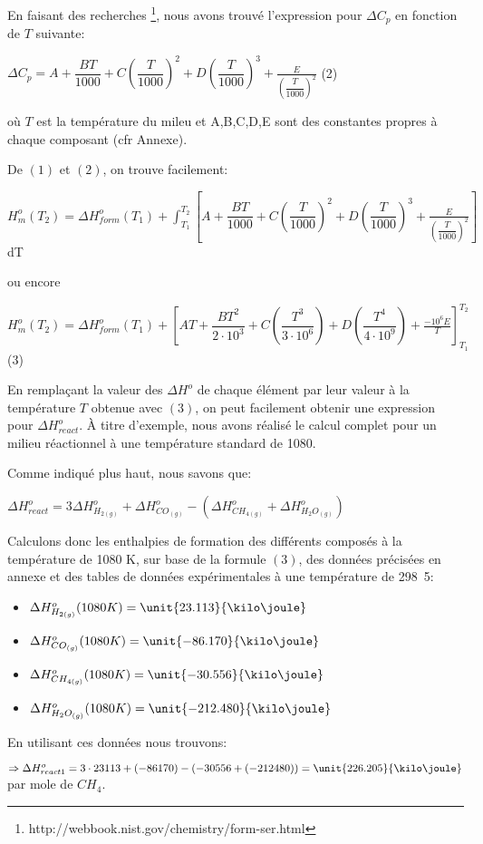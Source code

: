 \documentclass[11pt,a4paper]{report}
\begin{document}
En faisant des recherches \footnote{http://webbook.nist.gov/chemistry/form-ser.html}, nous avons trouvé l'expression pour $\Delta C_p$ en fonction de $T$ suivante:

$\Delta C_p=A+\dfrac{BT}{1000}+C(\dfrac{T}{1000})^2+D(\dfrac{T}{1000})^3+\frac{E}{(\dfrac{T}{1000})^2}$        (2)

où $T$ est la température du mileu et A,B,C,D,E sont des constantes propres à chaque composant (cfr Annexe).

De $(1)$ et $(2)$, on trouve facilement:

$H^o_m(T_2)=\Delta H^o_{form}(T_1)+\int_{T_1}^{T_2} [A+\dfrac{BT}{1000}+C(\dfrac{T}{1000})^2+D(\dfrac{T}{1000})^3+\frac{E}{(\dfrac{T}{1000})^2}]$dT

ou encore

$H^o_m(T_2)=\Delta H^o_{form}(T_1) + [AT+\dfrac{BT^2}{2\cdot10^3}+C(\dfrac{T^3}{3\cdot10^6})+D(\dfrac{T^4}{4\cdot10^9})+\frac{-10^6E}{T}]^{T_2}_{T_1}$(3) 

En remplaçant la valeur des $\Delta H^o$ de chaque élément par leur valeur à la température $T$ obtenue avec $(3)$, on
peut facilement obtenir une expression pour $\Delta H^o_{react}$. À titre d'exemple, nous avons réalisé le calcul complet
pour un milieu réactionnel à une température standard de \unit{1080}{\kelvin}.

Comme indiqué plus haut, nous savons que:

$\Delta H^o_{react}=3\Delta H^o_{H_{2(g)}} + \Delta H^o_{CO_{(g)}} - (\Delta H^o_{CH_{4(g)}} + \Delta H^o_{H_{2}O_{(g)}})$

Calculons donc les enthalpies de formation des différents composés à la température de 1080 K, sur base de la formule 
$(3)$, des données précisées en annexe et des tables de données expérimentales à une température de \unit{298.5}{\kelvin}:

\begin{itemize}
\item{$\Delta H^o_{H_{2(g)}} (1080K)= \unit{23.113}{\kilo\joule}$}
\item{$\Delta H^o_{CO_{(g)}} (1080K)= \unit{-86.170}{\kilo\joule}$}
\item{$\Delta H^o_{CH_{4(g)}} (1080K)= \unit{-30.556}{\kilo\joule}$}
\item{$\Delta H^o_{H_{2}O_{(g)}} (1080K)= \unit{-212.480}{\kilo\joule}$}
\end{itemize}

En utilisant ces données nous trouvons:

$\Rightarrow \Delta H^o_{react1}= 3\cdot 23113 + (-86170) - (-30556 + (-212480))= \unit{226.205}{\kilo\joule}$ par mole de $CH_4$.
\end{document}
